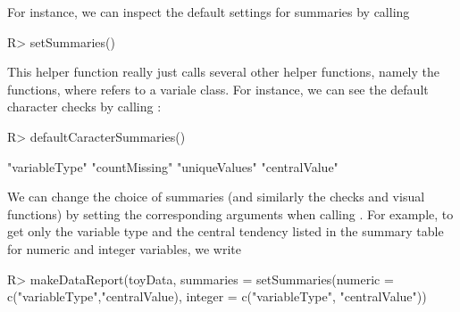 \documentclass[article,shortnames]{jss}
\begin{document}
For instance, we can inspect the default settings for summaries by calling

\begin{Schunk}
\begin{Sinput}
R> setSummaries()
\end{Sinput}
\end{Schunk} %

This helper function really just calls several other helper functions, namely the \\ 
 functions, where  refers to a variale class. For instance, we can see the default character checks by calling :

\begin{Schunk}
\begin{Sinput}
R> defaultCaracterSummaries()
\end{Sinput}
\begin{Soutput}
[1] "variableType" "countMissing" "uniqueValues" "centralValue"
\end{Soutput}
\end{Schunk}

We can change the choice of summaries (and similarly the checks and visual functions) by setting the
corresponding arguments when calling . For example, to get
only the variable type and the central tendency listed in the summary
table for numeric and integer variables, we write

\begin{Schunk}
\begin{Sinput}
R> makeDataReport(toyData, 
 	summaries = setSummaries(numeric = c("variableType","centralValue),
		integer = c("variableType", "centralValue"))
\end{Sinput}
\end{Schunk}
\end{document}
